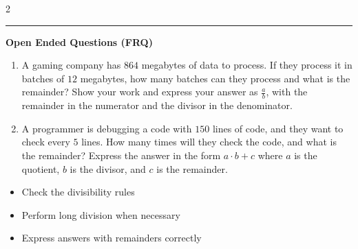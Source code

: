 \documentclass[10pt]{article}
\begin{document}
\begin{multicols}{2}
\begin{enumerate}[label=\textbf{Q\arabic*.}, leftmargin=*, itemsep=6pt, parsep=0pt]
\end{enumerate}
\end{multicols}

\vspace{-0.2cm}
\hrule
\vspace{0.2cm}
\textbf{\small Open Ended Questions (FRQ)}
\begin{enumerate}[label=\textbf{Q\arabic*.}, start=9, itemsep=5pt, topsep=0pt]

  \item \small A gaming company has $864$ megabytes of data to process. If they process it in batches of $12$ megabytes, how many batches can they process and what is the remainder? Show your work and express your answer as $\frac{a}{b}$, with the remainder in the numerator and the divisor in the denominator. \vspace{2cm}

  \item \small A programmer is debugging a code with $150$ lines of code, and they want to check every $5$ lines. How many times will they check the code, and what is the remainder? Express the answer in the form $a \cdot b + c$ where $a$ is the quotient, $b$ is the divisor, and $c$ is the remainder. \vspace{2cm}

\end{enumerate}

\vfill

\begin{tcolorbox}[colback=blue!5, colframe=mainblue!50, title=\small \textbf{Chef's Tips}, fonttitle=\bfseries, bottom=1mm]
\begin{itemize}[noitemsep, topsep=2pt, leftmargin=0.5cm]
  \item \scriptsize Check the divisibility rules\item \scriptsize Perform long division when necessary\item \scriptsize Express answers with remainders correctly
\end{itemize}
\end{tcolorbox}
\end{document}
